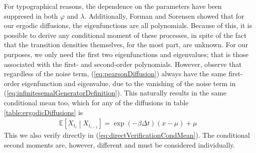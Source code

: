 For typographical reasons, the dependence on the parameters have been suppresed in both $\varphi$ and $\lambda$. Additionally, Forman and Sorensen \cite{FormanSorensen2008} showed that for our ergodic diffusions, the eigenfunctions are all polynomials. Because of this, it is possible to derive any conditional moment of these processes, in spite of the fact that the transition densities themselves, for the most part, are unknown. For our purposes, we only need the first two eigenfunctions and eigenvalues; that is those associated with the first- and second-order polynomials. However, observe that regardless of the noise term, (\ref{eq:pearsonDiffusion}) always have the same first-order eigenfunction and eigenvalue,  due to the vanishing of the noise term in (\ref{eq:infinitesemalGeneratorDefinition}). This naturally results in the same conditional mean too, which for any of the diffusions in table \ref{table:ergodicDiffusions} is
\begin{align}
    \mathbb{E}\left[X_{t_{i}} \middle|X_{t_{i - 1}} \right] = \exp\left(-\beta\Delta t\right)\left(x-\mu\right) + \mu
\end{align}
This we also verify directly in (\ref{eq:directVerificationCondMean}). The conditional second moments are, however, different and must be considered individually. 
